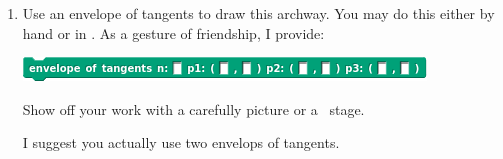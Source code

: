\documentclass[noauthor,nooutcomes,hints,handout]{../ximera}
\begin{document}
\begin{question}
\begin{enumerate}
%
%
%
%          
% 
  \item Use an envelope of tangents to draw this archway. You may do
    this either by hand or in \snap.  As a gesture of friendship, I provide:
    \begin{center}
    \includegraphics{envelopeOfTangentsBlank.png} 
    \end{center}
    Show off your work with a carefully picture or a \snap\ stage.
    \begin{hint}
      I suggest you actually use two envelops of tangents.
    \end{hint}
  \end{enumerate}
  \begin{freeResponse}

\end{freeResponse}
\end{question}
\end{document}
